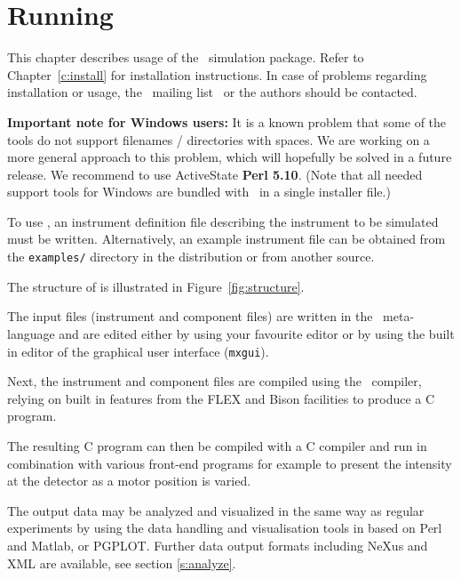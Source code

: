 
\chapter{Running \MCX}
\label{c:running}
This chapter describes usage of the \MCX\ simulation package. Refer
to Chapter~\ref{c:install} for installation instructions. In case of
problems regarding installation or usage, the \MCX\ mailing
list~\cite{mcxtrace_webpage} or the authors should be contacted.

{\bfseries Important note for Windows users:} It is a known problem that some of
the \MCX tools do not support filenames / directories with spaces.
We are working on a more general approach to this problem, which will
hopefully be solved in a future release. We recommend to use
ActiveState {\bfseries Perl 5.10}. (Note that all needed
support tools for Windows are bundled with \MCX\ in a single installer file.)

To use \MCX, an instrument
definition file describing the instrument to be simulated must be
written. Alternatively, an example instrument file can be obtained
from the \verb+examples/+ directory in the distribution or from
another source.

The structure of \MCX is illustrated in Figure~\ref{fig:structure}.

The input files (instrument and component files) are written in the \MCX\
meta-language and are edited either by using your favourite editor
or by using the built in editor of the graphical user interface
(\texttt{mxgui}).

Next, the instrument and component files are compiled using the \MCX\
compiler, relying on built in features from the FLEX and Bison facilities to produce a C program.

The resulting C program can then be
compiled with a C compiler and run in combination with various
front-end programs for example to present the intensity at the
detector as a motor position is varied.

The output data may be analyzed and visualized in the same way as
regular experiments by using the data handling and visualisation tools in \MCX based on
Perl and Matlab, or PGPLOT. Further data
output formats including NeXus and XML are available, see section \ref{s:analyze}.

%

